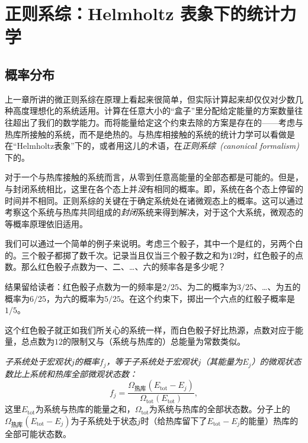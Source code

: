 \chapter{正则系综：Helmholtz 表象下的统计力学}\label{chap16}
\section{概率分布}\label{sec16.1}
上一章所讲的微正则系综在原理上看起来很简单，但实际计算起来却仅仅对少数几种高度理想化的系统适用。计算在任意大小的“盒子”里分配给定能量的方案数量往往超出了我们的数学能力。而将能量给定这个约束去除的方案是存在的——考虑与热库所接触的系统，而不是绝热的。与热库相接触的系统的统计力学可以看做是在“Helmholtz表象”下的，或者用这儿的术语，在{\it 正则系综~(canonical formalism)}下的。

对于一个与热库接触的系统而言，从零到任意高能量的全部态都是可能的。但是，与封闭系统相比，这里在各个态上并{\it 没}有相同的概率。即，系统在各个态上停留的时间并不相同。正则系综的关键在于确定系统处在诸微观态上的概率。这可以通过考察这个系统与热库共同组成的{\it 封闭}系统来得到解决，对于这个大系统，微观态的等概率原理依旧适用。

我们可以通过一个简单的例子来说明。考虑三个骰子，其中一个是红的，另两个白的。三个骰子都掷了数千次。记录当且仅当三个骰子数之和为$12$时，红色骰子的点数。那么红色骰子点数为一、二、\dots 、六的频率各是多少呢？

结果留给读者：红色骰子点数为一的频率是$2/25$、为二的概率为$3/25$、\dots 、为五的概率为$6/25$，为六的概率为$5/25$。在这个约束下，掷出一个六点的红骰子概率是$1/5$。

这个红色骰子就正如我们所关心的系统一样，而白色骰子好比热源，点数对应于能量，总点数为$12$的限制又与（系统与热库的）总能量为常数类似。

{\it 子系统处于宏观状$j$的概率$f_j$，等于子系统处于宏观状$j$（其能量为$E_j$）的微观状态数比上系统和热库全部微观状态数：}
\begin{equation}
f_j = \frac{\Omega_\text{热库}(E_\text{tot}-E_j)}{\Omega_\text{tot}(E_\text{tot})},
\end{equation}
这里$E_\text{tot}$为系统与热库的能量之和，$\Omega_\text{tot}$为系统与热库的全部状态数。分子上的$\Omega_\text{热库}(E_\text{tot}-E_j)$为子系统处于状态$j$时（给热库留下了$E_\text{tot}-E_j$的能量）热库的全部可能状态数。

